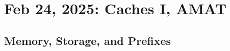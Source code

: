\documentclass[11pt]{article}
\begin{document}




\pagebreak
\section{Feb 24, 2025: Caches I, AMAT}




\subsection{Memory, Storage, and Prefixes}
\end{document}
